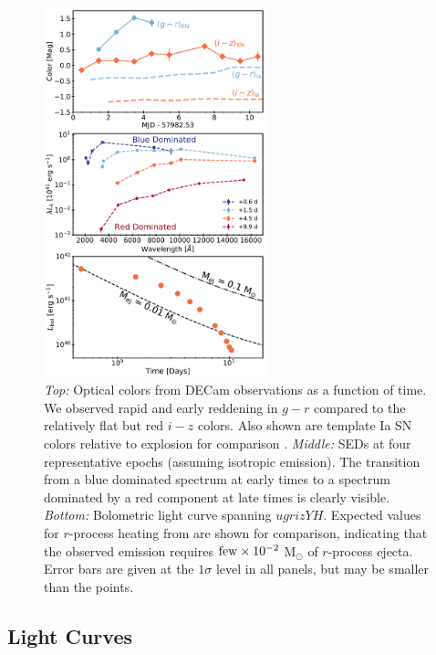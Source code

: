 \begin{figure}[!t]
\begin{center}
\includegraphics[width=0.575\textwidth]{./figs/chapter5/sed_col_bol_alt.pdf}
\caption{{\it Top:} Optical colors from DECam observations as a function of time.  We observed rapid and early reddening in $g-r$ compared to the relatively flat but red $i-z$ colors. Also shown are template Ia SN colors relative to explosion for comparison \citep{Nugent+02}. {\it Middle:} SEDs at four representative epochs (assuming isotropic emission). The transition from a blue dominated spectrum at early times to a spectrum dominated by a red component at late times is clearly visible. {\it Bottom:} Bolometric light curve spanning $ugrizYH$. Expected values for $r$-process heating from \cite{Metzger+10} are shown for comparison, indicating that the observed emission requires ${\rm few}\times 10^{-2}$ M$_\odot$ of $r$-process ejecta. Error bars are given at the $1\sigma$ level in all panels, but may be smaller than the points.}
\label{fig:ch5_sed}
\end{center}
\end{figure}

\subsection{Light Curves}
\label{sec:ch5_lc}

